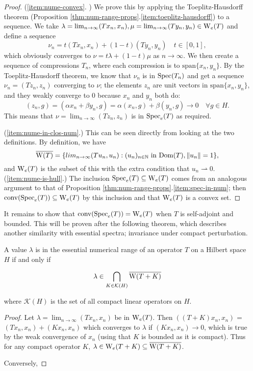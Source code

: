 \documentclass[../main.tex]{subfiles}
\begin{document}
\begin{proof}
(\ref{item:nume-convex}. \cite{bogli2020essential}) We prove this by applying the Toeplitz-Hausdorff theorem (Proposition \ref{thm:num-range-props}.\ref{item:toeplitz-hausdorff}) to a sequence. We take $\lambda = \lim_{n \rightarrow \infty}(Tx_n, x_n), \mu = \lim_{n \rightarrow \infty}(Ty_n, y_n) \in \mathrm{W}_e(T)$
and define a sequence $$\nu_n = t(Tx_n, x_n) + (1-t)(Ty_n, y_n) \quad t \in [0, 1],$$ which obviously converges to $\nu = t\lambda + (1-t)\mu$ as 
$n \rightarrow \infty$.
We then create a sequence of compressions $T_n$, where each compression is to $\text{span}\{x_n, y_n\}$. By the Toeplitz-Hausdorff theorem,
we know that $\nu_n$ is in $\mathrm{Spec}(T_n)$ and get a sequence $\nu_n = (Tz_n, z_n)$ converging to $\nu$; the elements $z_n$ are unit vectors in $\text{span}\{x_n, y_n\}$, and they weakly converge to 0 because $x_n$ and $y_n$ both do:
$$(z_n, g) = (\alpha x_n + \beta y_n, g) = \alpha(x_n, g) + \beta(y_n, g) \rightarrow 0 \quad \forall g \in H.$$
This means that $\nu = \lim_{n \rightarrow \infty}(Tz_n, z_n)$ is in $\mathrm{Spec}_e(T)$ as required.

(\ref{item:nume-in-clos-num}.) This can be seen directly from looking at the two definitions. By definition, we have
$$\overline{\mathrm{W}(T)} = \{lim_{n \rightarrow \infty}( Tu_n, u_n ) : (u_n)_{n \in \mathbb{N}}\text{ in } \mathrm{Dom}(T), \|u_n\|=1\},$$ and $\mathrm{W}_e(T)$ is the subset of this with the extra condition
that $u_n \rightharpoonup 0$.
\\
(\ref{item:nume-is-hull}.) The inclusion $\mathrm{Spec}_e(T) \subseteq \mathrm{W}_e(T)$ comes from an analogous argument
to that of Proposition \ref{thm:num-range-props}.\ref{item:spec-in-num}; then $\mathrm{conv}(\mathrm{Spec}_e(T)) \subseteq \mathrm{W}_e(T)$
by this inclusion and that $\mathrm{W}_e(T)$ is a convex set.
\end{proof}
It remains to show that $\mathrm{conv}(\mathrm{Spec}_e(T)) = \mathrm{W}_e(T)$ when $T$ is self-adjoint and bounded. 
This will be proven after the following theorem, which describes another similarity with essential spectra; invariance under compact perturbation.

\begin{theorem}
A value $\lambda$ is in the essential numerical range of an operator $T$ on a Hilbert space $H$ if and only if

$$\lambda \in \bigcap_{K \in \mathcal{K}(H)} \overline{\mathrm{W}(T+K)}$$

where $\mathcal{K}(H)$ is the set of all compact linear operators on $H$. 
\end{theorem}
\begin{proof}
Let $\lambda = \lim_{n \rightarrow \infty}(Tx_n, x_n)$ be in $\mathrm{W}_e(T)$. Then $((T+K)x_n, x_n)$ = $(Tx_n, x_n) + (Kx_n, x_n)$ 
which converges to $\lambda$ if $(Kx_n, x_n) \rightarrow 0$, which is true by the weak convergence of $x_n$ (using that $K$ is bounded as it is compact). Thus for any compact operator $K$, 
$\lambda \in \mathrm{W}_e(T+K) \subseteq \overline{\mathrm{W}(T+K)}$.

Conversely, %
\end{proof}
\end{document}
